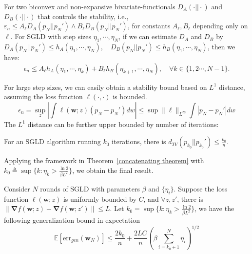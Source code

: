 \documentclass[final,12pt]{colt2018} %
\begin{document}
\begin{theorem}
  \label{concatenating theorem}
    For two biconvex and non-expansive bivariate-functionals $D_A(\cdot||\cdot)$ and $D_B(\cdot||\cdot)$ that controls the stability, i.e., $\varepsilon_n\leq A_\ell D_A(p_N||p_N')\wedge B_\ell D_B(p_N||p_N')$, for constants $A_\ell,B_\ell$ depending only on $\ell$. For SGLD with step sizes $\eta_1,\cdots, \eta_N$, if we can estimate $D_A$ and $D_B$ by $D_A(p_N||p_N')\le h_A(\eta_1,\cdots, \eta_N),\quad D_B(p_N||p_N')\le h_B(\eta_1,\cdots, \eta_N)$, then we have:
    \begin{equation}
      \epsilon_n  \le A_\ell h_A(\eta_1,\cdots, \eta_k)+ B_\ell h_B(\eta_{k+1},\cdots, \eta_N),\quad \forall k\in \{1,2\cdots,N-1\}.
    \end{equation}
\end{theorem}
For large step sizes, we can easily obtain a stability bound based on $L^1$ distance, assuming the loss function $\ell(\cdot,\cdot)$ is bounded.
\begin{equation}
  \epsilon_n = \sup_z\left|\int \ell(\bm{w};z)(p_N- p_N')d w\right|\leqslant \sup\|\ell\|_{L^\infty}\int|p_N - p_N'|dw
\end{equation}
The $L^1$ distance can be further upper bounded by number of iterations:
\begin{lemma}
  \label{Stability-absolute difference}
  For an SGLD algorithm running $k_0$ iterations, there is $d_{TV}(p_{k_0}||p_{k_0}')\leq \frac{k_0}{n}$.
\end{lemma}
Applying the framework in Theorem~\ref{concatenating theorem} with $k_0\triangleq\sup\{k:\eta_{k}> \frac{\ln 2}{\beta L^2}\}$, we obtain the final result.
\begin{theorem}
  \label{stability-final}
  Consider $N$ rounds of SGLD with parameters $\beta$ and $\{\eta_i\}$. Suppose the loss function $\ell(\bm{w};z)$ is uniformly bounded by $C$, and $\forall z,z'$, there is $\|\bm{\nabla}f(\bm{w};z)-\bm{\nabla}f(\bm{w};z')\|\le L$. Let $k_0=\sup\{k:\eta_{k}> \frac{\ln 2}{\beta L^2}\}$, we have the following generalization bound in expectation
  \begin{equation}
  \mathbb{E}[\mathrm{err}_{gen}(\bm{w}_N)]\leq \frac{2k_0}{n} +\frac{2LC}{n}\left(\beta\sum\limits_{i=k_0+1}^N \eta_i\right)^{1/2}
  \end{equation}
\end{theorem}
\end{document}
